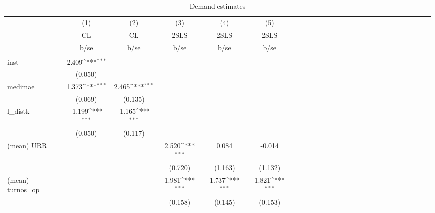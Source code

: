 \begin{table}[htbp]\centering
\def\sym#1{\ifmmode^{#1}\else\(^{#1}\)\fi}
\caption{Demand estimates}
\begin{tabular}{l*{5}{c|cccc}}
\toprule
                    &\multicolumn{1}{c}{(1)}&\multicolumn{1}{c}{(2)}&\multicolumn{1}{c}{(3)}&\multicolumn{1}{c}{(4)}&\multicolumn{1}{c}{(5)}\\
                    &\multicolumn{1}{c}{CL}&\multicolumn{1}{c}{CL}&\multicolumn{1}{c}{2SLS}&\multicolumn{1}{c}{2SLS}&\multicolumn{1}{c}{2SLS}\\
                    &        b/se         &        b/se         &        b/se         &        b/se         &        b/se         \\
\midrule
                    &                     &                     &                     &                     &                     \\
inst                &       2.409\sym{***}&                     &                     &                     &                     \\
                    &     (0.050)         &                     &                     &                     &                     \\
medimae             &       1.373\sym{***}&       2.465\sym{***}&                     &                     &                     \\
                    &     (0.069)         &     (0.135)         &                     &                     &                     \\
l\_distk             &      -1.199\sym{***}&      -1.165\sym{***}&                     &                     &                     \\
                    &     (0.050)         &     (0.117)         &                     &                     &                     \\
(mean) URR          &                     &                     &       2.520\sym{***}&       0.084         &      -0.014         \\
                    &                     &                     &     (0.720)         &     (1.163)         &     (1.132)         \\
(mean) turnos\_op    &                     &                     &       1.981\sym{***}&       1.737\sym{***}&       1.821\sym{***}\\
                    &                     &                     &     (0.158)         &     (0.145)         &     (0.153)         \\

\end{tabular}
\end{table}
